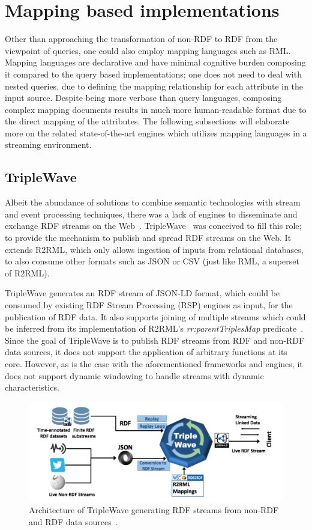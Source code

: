 \section{Mapping based implementations}
\label{sec:mapping_based_implementation}
Other than approaching the transformation of non-RDF to RDF from the viewpoint of 
queries, one could also employ mapping languages such as RML. Mapping languages 
are declarative and have minimal cognitive burden composing it compared to the
query based implementations; one does not need to deal with nested queries,
due to defining the mapping relationship for each attribute in 
the input source. Despite being more 
verbose than query languages, composing complex mapping documents results in much more human-readable 
format due to the direct mapping of the attributes. 
The following subsections will elaborate more on the related state-of-the-art engines 
which utilizes mapping languages in a streaming environment.

\subsection{TripleWave}
Albeit the abundance of solutions to combine semantic technologies with stream and event processing 
techniques, there was a lack of engines to disseminate and exchange RDF streams on the Web~\cite{triple_wave}. 
TripleWave~\cite{triple_wave} was conceived to fill this role; to provide the mechanism to publish and spread RDF streams on the Web. 
It extends R2RML, which only allows ingestion of inputs from relational databases, 
to also consume other formats such as JSON or CSV (just like RML, a superset of R2RML). 

TripleWave generates an RDF stream of JSON-LD format, which could be consumed by existing
RDF Stream Processing (RSP) engines as input, for the publication of RDF data.
It also supports joining of multiple streams which could be inferred from its implementation of R2RML's \emph{rr:parentTriplesMap} predicate~\cite{triple_wave}. Since the goal of TripleWave 
is to publish RDF streams from RDF and non-RDF data sources, it does not support the 
application of arbitrary functions at its core. 
However, as is the case with the aforementioned frameworks and engines, 
it does not support dynamic windowing to handle streams 
with dynamic characteristics. 


\begin{figure}[!htbp]
  \centering
  \includegraphics[width=\textwidth]{fig/triple-wave-arch.png}
  \caption{Architecture of TripleWave generating RDF streams from non-RDF and RDF data sources~\cite{triple_wave}. }
  \label{fig:triple-wave-arch}
\end{figure}

